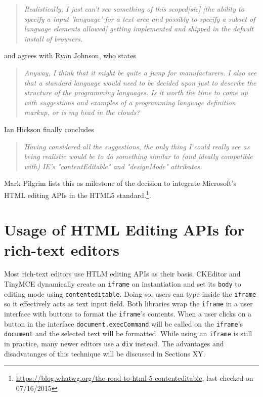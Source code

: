 \begin{quotation}
\textit{Realistically, I just can't see something of this scoped[sic] [the ability to specify a input 'language' for a text-area and possibly to specify a subset of language elements allowed] getting implemented and shipped in the default install of browsers.}
\end{quotation}

and agrees with Ryan Johnson, who states

\begin{quotation}
\textit{Anyway, I think that it might be quite a jump for manufacturers. I also see that a standard language would need to be decided upon just to describe the structure of the programming languages. Is it worth the time to come up with suggestions and examples of a programming language definition markup, or is my head in the clouds?}
\end{quotation}

Ian Hickson finally concludes

\begin{quotation}
\textit{Having considered all the suggestions, the only thing I could really see 
as being realistic would be to do something similar to (and ideally 
compatible with) IE's "contentEditable" and "designMode" attributes.}
\end{quotation}

Mark Pilgrim lists this as milestone of the decision to integrate Microsoft's HTML editing APIs in the HTML5 standard.\footnote{\url{https://blog.whatwg.org/the-road-to-html-5-contenteditable}, last checked on 07/16/2015}.


\section{Usage of HTML Editing APIs for rich-text editors}
\label{sec:useage-of-html-editing-apis}

Most rich-text editors use HTLM editing APIs as their basis. CKEditor and TinyMCE dynamically create an \texttt{iframe} on instantiation and set its \texttt{body} to editing mode using \texttt{contenteditable}. Doing so, users can type inside the \texttt{iframe} so it effectively acts as text input field. Both libraries wrap the \texttt{iframe} in a user interface with buttons to format the \texttt{iframe}'s contents. When a user clicks on a button in the interface \texttt{document.execCommand} will be called on the \texttt{iframe}'s \texttt{document} and the selected text will be formatted. While using an \texttt{iframe} is still in practice, many newer editors use a  \texttt{div} instead. The advantages and disadvatanges of this technique will be discussed in Sections XY.


